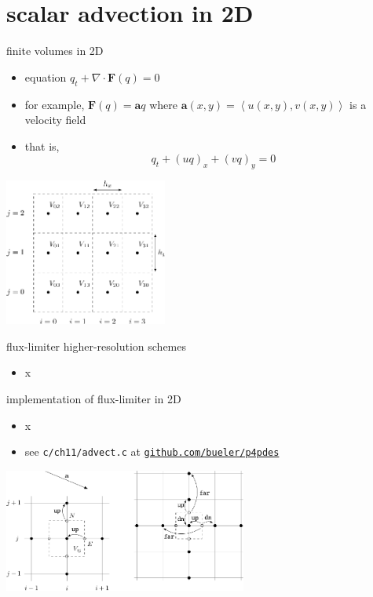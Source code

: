 \documentclass[10pt,hyperref,dvipsnames]{beamer}
\newcommand{\ba}{\mathbf{a}}
\newcommand{\bF}{\mathbf{F}}
\newcommand{\Div}{\nabla\cdot}
\begin{document}
\section{scalar advection in 2D}

\begin{frame}{finite volumes in 2D}

\begin{itemize}
\item equation $q_t + \Div \bF(q) = 0$
\item for example, $\bF(q) = \ba q$ where $\ba(x,y) = \left<u(x,y), v(x,y)\right>$ is a velocity field
\item that is,
    $$q_t + (u q)_x + (v q)_y = 0$$
\end{itemize}

\hfill \includegraphics[width=0.4\textwidth]{figs/bueler11p1}
\end{frame}


\begin{frame}{flux-limiter higher-resolution schemes}

\begin{itemize}
\item x
\end{itemize}
\end{frame}


\begin{frame}{implementation of flux-limiter in 2D}

\begin{itemize}
\item x
\item see \texttt{c/ch11/advect.c} at \href{https://github.com/bueler/p4pdes}{\texttt{github.com/bueler/p4pdes}}
\end{itemize}

\begin{center}
\includegraphics[width=0.6\textwidth]{figs/bueler11p8}
\end{center}

\end{frame}
\end{document}
